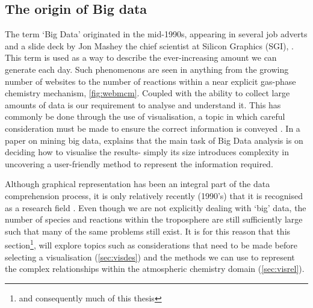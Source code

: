 %
%
%
%





\subsection{The origin of Big data}
The term `Big Data' originated in the mid-1990s, appearing in several job adverts and a slide deck by Jon Mashey the chief scientist at Silicon Graphics (SGI), \citep{slidedeck,bigdataorigin}. This term is used as a way to describe the ever-increasing amount we can generate each day. Such phenomenons are seen in anything from the growing number of websites to the number of reactions within a near explicit gas-phase chemistry mechanism, \autoref{fig:webmcm}. Coupled with the ability to collect large amounts of data is our requirement to analyse and understand it. This has commonly be done through the use of visualisation, a topic in which careful consideration must be made to ensure the correct information is conveyed \citep{kirk}. In a paper on mining big data, \citep{bigdatamine} explains that the main task of Big
Data analysis is on deciding how to visualise the results- simply its size introduces complexity in uncovering a user-friendly method to represent the information required.

Although graphical representation has been an integral part of the data comprehension process, it is only relatively recently (1990's) that it is recognised as a research field \citep{ch6}. Even though we are not explicitly dealing with `big' data, the number of species and reactions within the troposphere are still sufficiently large such that many of the same problems still exist. It is for this reason that this section\footnote{and consequently much of this thesis}, will explore topics such as considerations that need to be made before selecting a visualisation (\autoref{sec:visdes}) and the methods we can use to represent the complex relationships within the atmospheric chemistry domain (\autoref{sec:visrel}).

